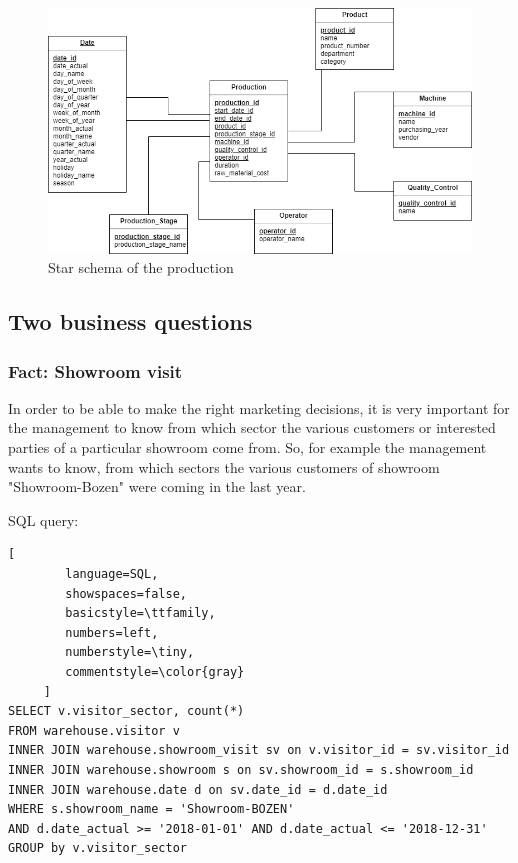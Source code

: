 \documentclass[letterpaper,12pt]{article}
\begin{document}
\begin{figure}[h] 
        \centering
        \includegraphics[width=\columnwidth]{../images/Starschema_Production.png}
        \caption{
                \label{fig:starschemaProduction}  
                Star schema of the production
        }
\end{figure}

\subsection{Two business questions}

\subsubsection{Fact: Showroom visit}

In order to be able to make the right marketing decisions, it is very important for the management to know from which sector the various customers or interested parties of a particular showroom come from. So, for example the management wants to know, from which sectors the various customers of showroom "Showroom-Bozen" were coming in the last year.

\bigskip
\noindent SQL query:
\begin{lstlisting}[
        language=SQL,
        showspaces=false,
        basicstyle=\ttfamily,
        numbers=left,
        numberstyle=\tiny,
        commentstyle=\color{gray}
     ]
SELECT v.visitor_sector, count(*)
FROM warehouse.visitor v
INNER JOIN warehouse.showroom_visit sv on v.visitor_id = sv.visitor_id
INNER JOIN warehouse.showroom s on sv.showroom_id = s.showroom_id
INNER JOIN warehouse.date d on sv.date_id = d.date_id
WHERE s.showroom_name = 'Showroom-BOZEN' 
AND d.date_actual >= '2018-01-01' AND d.date_actual <= '2018-12-31'
GROUP by v.visitor_sector
\end{lstlisting}
\end{document}

